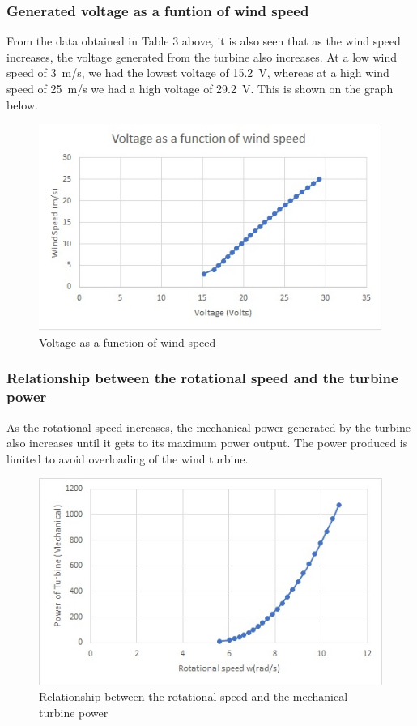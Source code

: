 \documentclass[titlepage]{article}
\begin{document}
\subsubsection{Generated voltage as a funtion of wind speed}
From the data obtained in Table 3 above, it is also seen that as the wind speed increases, the voltage generated from the turbine also increases. At a low wind speed of 3~m/s, we had the lowest voltage of 15.2~V, whereas at a high wind speed of 25~m/s we had a high voltage of 29.2~V. This is shown on the graph below.

\begin{figure}[h!]
\centering
\includegraphics[scale=1]{vgen.jpg}
\caption{Voltage as a function of wind speed}
\label{Vgen}
\end{figure}

\subsubsection{Relationship between the rotational speed and the turbine power}
As the rotational speed increases, the mechanical power generated by the turbine also increases until it gets to its maximum power output. The power produced is limited to avoid overloading of the wind turbine.

\begin{figure}[h!]
\centering
\includegraphics[scale=1]{turbinepower.jpg}
\caption{Relationship between the rotational speed and the mechanical turbine power}
\label{turbinepower}
\end{figure}
\clearpage
\end{document}
